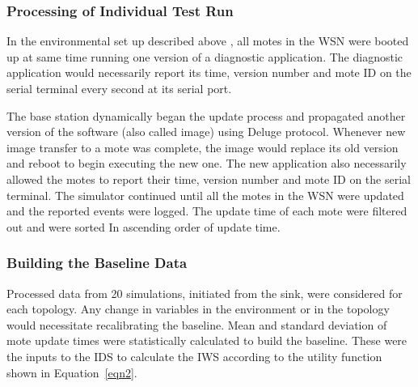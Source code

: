 \documentclass[conference,manuscript]{IEEEtran}
\begin{document}
\subsubsection*{Processing  of Individual Test Run}
\label{ssc:test_runs}
In the environmental set up described above , all motes in the WSN were booted up at same time running one version of a diagnostic application. 
The diagnostic application would necessarily report its time, version number and mote ID on the serial terminal every second at its serial port. 


The base station dynamically began the update process and propagated another version of the software (also called image) using Deluge protocol. %
Whenever new image transfer to a mote was complete, the image would replace its old version and reboot to begin executing the new one.
The new application also necessarily allowed the motes to report their time, version number and mote ID on the serial terminal. 
The simulator continued until all the motes in the WSN were updated and the reported events were logged. 
The update time of each mote were filtered out  and were sorted In ascending order of update time.


\subsubsection*{Building the Baseline Data}
\label{ssc:build_baseline}
Processed data from 20 simulations, initiated from the sink, were considered for each topology.
Any change in variables in the environment or in the topology would necessitate recalibrating the baseline.
Mean and standard deviation of mote update times were statistically calculated to build the baseline.
These were the inputs to the IDS to calculate the IWS according to the utility function shown in Equation~\ref{eqn2}. 
\end{document}
